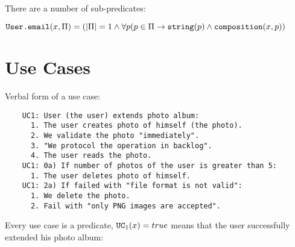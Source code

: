 \documentclass{article}
\begin{document}
    There are a number of sub-predicates:

    \begin{maths}
    $\mbox{\texttt{User.email}}(x, \Pi) = (|\Pi| = 1 \wedge \forall p(p \in \Pi \to \mbox{\texttt{string}}(p) \wedge \mbox{\texttt{composition}}(x, p))$ \\
    \end{maths}
    
\newpage
\section{Use Cases}

    Verbal form of a use case:
    
    \begin{verbatim}
    UC1: User (the user) extends photo album:
      1. The user creates photo of himself (the photo).
      2. We validate the photo "immediately".
      3. "We protocol the operation in backlog".
      4. The user reads the photo.
    UC1: 0a) If number of photos of the user is greater than 5:
      1. The user deletes photo of himself.
    UC1: 2a) If failed with "file format is not valid":
      1. We delete the photo.
      2. Fail with "only PNG images are accepted".\end{verbatim}

    Every use case is a predicate, $\mbox{\texttt{UC}}_1(x) = true$ means that the user
    successfully extended his photo album:
    
\end{document}
